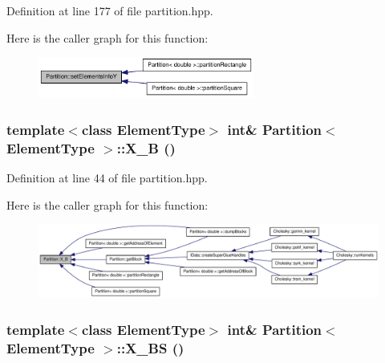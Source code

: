 Definition at line 177 of file partition.hpp.

Here is the caller graph for this function:\nopagebreak
\begin{figure}[H]
\begin{center}
\leavevmode
\includegraphics[width=201pt]{class_partition_a67f73cecff570475924b28cad0a77e6c_icgraph}
\end{center}
\end{figure}
\hypertarget{class_partition_ae9748490144ee2cbf5ca2e2fdb355f64}{
\subsubsection[{X\_\-B}]{\setlength{\rightskip}{0pt plus 5cm}template$<$class ElementType$>$ int\& {\bf Partition}$<$ ElementType $>$::X\_\-B ()}}
\label{class_partition_ae9748490144ee2cbf5ca2e2fdb355f64}


Definition at line 44 of file partition.hpp.

Here is the caller graph for this function:\nopagebreak
\begin{figure}[H]
\begin{center}
\leavevmode
\includegraphics[width=420pt]{class_partition_ae9748490144ee2cbf5ca2e2fdb355f64_icgraph}
\end{center}
\end{figure}
\hypertarget{class_partition_a439ac208be8dbee772f9fe167a95581b}{
\subsubsection[{X\_\-BS}]{\setlength{\rightskip}{0pt plus 5cm}template$<$class ElementType$>$ int\& {\bf Partition}$<$ ElementType $>$::X\_\-BS ()}}
\label{class_partition_a439ac208be8dbee772f9fe167a95581b}


